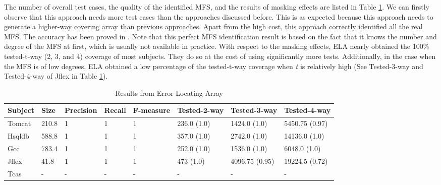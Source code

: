 \documentclass[journal,12pt,onecolumn,draftclsnofoot,]{IEEEtran}
\begin{document}
The number of overall test cases, the quality of the identified MFS, and the results of masking effects are listed in Table \ref{cm_ela}. We can firstly observe that this approach needs more test cases than the approaches discussed before. This is as expected because this approach needs to generate a higher-way covering array than previous approaches. Apart from the high cost, this approach correctly identified all the real MFS. The accuracy has been proved in \cite{martinez2008algorithms,martinez2009locating}.  Note that this perfect MFS identification result is based on the fact that it knows the number and degree of the MFS at first, which is usually not available in practice.  %
With respect to the masking effects, ELA nearly obtained the 100\% tested-t-way (2, 3, and 4) coverage of most subjects. They do so at the cost of using significantly more tests. Additionally, in the case when the MFS is of low degrees, ELA obtained a low percentage of the tested-t-way coverage when \emph{t} is relatively high (See Tested-3-way and Tested-4-way of Jflex in Table \ref{cm_ela}).


\begin{table}[htbp]
\center
\caption{Results from Error Locating Array}
\label{cm_ela}
\begin{tabular}{|l|l|l|l|l|l|l|l|}
\hline
Subject & Size   & Precision & Recall & F-measure & Tested-2-way  & Tested-3-way & Tested-4-way \\ \hline
Tomcat  & 210.8  & 1       & 1      & 1      &236.0 (1.0) & 1424.0 (1.0)  & 5450.75 (0.97)    \\
Hsqldb  & 588.8  & 1       & 1      & 1      & 357.0 (1.0) & 2742.0 (1.0) & 14136.0 (1.0)    \\
Gcc      &783.4 & 1       & 1      & 1       & 252.0 (1.0) & 1536.0 (1.0)  &   6048.0 (1.0) \\
Jflex   & 41.8   & 1       & 1      & 1      & 473 (1.0) &4096.75 (0.95)  &  19224.5 (0.72)  \\
Tcas    & - &  -       & -      & -     & -  & - & -   \\ \hline
\end{tabular}
\end{table}


%
\end{document}
